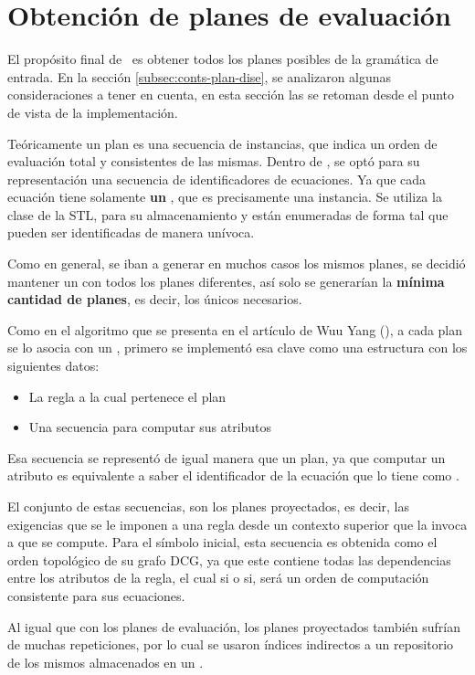 \section{Obtención de planes de evaluación}
\label{sec:obtplaneval}

El propósito final de \maggen\ es obtener todos los planes posibles de la gramática de entrada. En la sección \ref{subsec:conts-plan-dise}, se analizaron algunas consideraciones a tener en cuenta, en esta sección las se retoman desde el punto de vista de la implementación. 

Teóricamente un plan es una secuencia de instancias, que indica un orden de evaluación total y consistentes de las mismas. Dentro de \maggen, se optó para su representación una secuencia de identificadores de ecuaciones. Ya que cada ecuación tiene solamente \textbf{un} , que es precisamente una instancia. Se utiliza la clase  de la STL, para su almacenamiento y están enumeradas de forma tal que pueden ser identificadas de manera unívoca.

Como en general, se iban a generar en muchos casos los mismos planes, se decidió mantener un  con todos los planes diferentes, así solo se generarían la \textbf{mínima cantidad de planes}, es decir, los únicos necesarios.

Como en el algoritmo que se presenta en el artículo de Wuu Yang (\cite{wuu-yang1}), a cada plan se lo asocia con un , primero se implementó esa clave como una estructura con los siguientes datos:
\begin{itemize}
\item La regla a la cual pertenece el plan
\item Una secuencia para computar sus atributos
\end{itemize}

Esa secuencia se representó de igual manera que un plan, ya que computar un atributo es equivalente a saber el identificador de la ecuación que lo tiene como .

El conjunto de estas secuencias, son los planes proyectados, es decir, las exigencias que se le imponen a una regla desde un contexto superior que la invoca a que se compute. Para el símbolo inicial, esta secuencia es obtenida como el orden topológico de su grafo DCG, ya que este contiene todas las dependencias entre los atributos de la regla, el cual si o si, será un orden de computación consistente para sus ecuaciones.

Al igual que con los planes de evaluación, los planes proyectados también sufrían de muchas repeticiones, por lo cual se usaron índices indirectos a un repositorio de los mismos almacenados en un .

